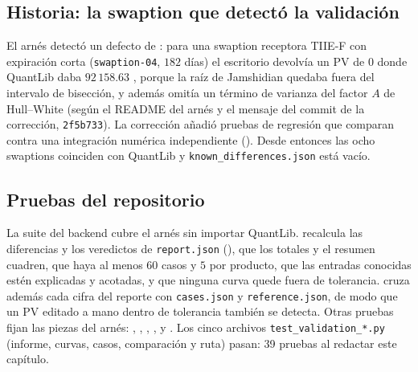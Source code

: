\subsection{Historia: la swaption que detectó la validación}

El arnés detectó un defecto de : para una
swaption receptora TIIE-F con expiración corta (\texttt{swaption-04}, $182$ días) el escritorio devolvía un PV de $0$ donde
QuantLib daba $92\,158.63$ \MXN, porque la raíz de Jamshidian quedaba fuera del intervalo de bisección, y además omitía un
término de varianza del factor $A$ de Hull--White (según el README del arnés y el mensaje del commit de la corrección,
\texttt{2f5b733}). La corrección añadió pruebas de regresión que comparan contra una integración numérica independiente
(). Desde entonces las ocho swaptions coinciden con QuantLib y
\texttt{known\_differences.json} está vacío.

\subsection{Pruebas del repositorio}

La suite del backend cubre el arnés sin importar QuantLib. 
recalcula las diferencias y los veredictos de \texttt{report.json} (), que los totales y el
resumen cuadren, que haya al menos $60$ casos y $5$ por producto, que las entradas conocidas estén explicadas y
acotadas, y que ninguna curva quede fuera de tolerancia. 
cruza además cada cifra del reporte con \texttt{cases.json} y \texttt{reference.json}, de modo que un PV editado a mano
dentro de tolerancia también se detecta. Otras pruebas fijan las piezas del arnés:
, ,
,
,
 y
. Los cinco
archivos \texttt{test\_validation\_*.py} (informe, curvas, casos, comparación y ruta) pasan: 39 pruebas al redactar
este capítulo.

